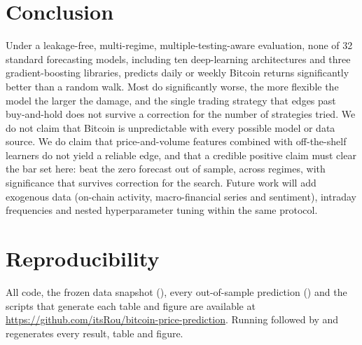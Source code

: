 \documentclass[conference]{IEEEtran}
\begin{document}
\section{Conclusion}
\label{sec:conclusion}
Under a leakage-free, multi-regime, multiple-testing-aware evaluation, none of 32 standard forecasting models, including ten deep-learning architectures and three gradient-boosting libraries, predicts daily or weekly Bitcoin returns significantly better than a random walk. Most do significantly worse, the more flexible the model the larger the damage, and the single trading strategy that edges past buy-and-hold does not survive a correction for the number of strategies tried. We do not claim that Bitcoin is unpredictable with every possible model or data source. We do claim that price-and-volume features combined with off-the-shelf learners do not yield a reliable edge, and that a credible positive claim must clear the bar set here: beat the zero forecast out of sample, across regimes, with significance that survives correction for the search. Future work will add exogenous data (on-chain activity, macro-financial series and sentiment), intraday frequencies and nested hyperparameter tuning within the same protocol.

\section*{Reproducibility}
{\raggedright
All code, the frozen data snapshot (), every out-of-sample prediction () and the scripts that generate each table and figure are available at \url{https://github.com/itsRou/bitcoin-price-prediction}. Running  followed by  and  regenerates every result, table and figure.\par}



\end{document}
